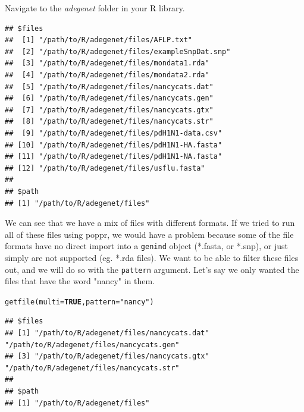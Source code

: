 \documentclass[letterpaper]{article}\usepackage[]{graphicx}\usepackage[]{color}
\makeatletter
\newcommand{\hlnum}[1]{\textcolor[rgb]{0.502,0,0.502}{\textbf{#1}}}%
\newcommand{\hlstr}[1]{\textcolor[rgb]{0.651,0.522,0}{#1}}%
\newcommand{\hlstd}[1]{\textcolor[rgb]{0,0,0}{#1}}%
\newcommand{\hlkwc}[1]{\textcolor[rgb]{0,0.502,0.753}{#1}}%
\newcommand{\hlkwd}[1]{\textcolor[rgb]{0,0.267,0.4}{#1}}%
\newenvironment{kframe}{%
 \def\at@end@of@kframe{}%
 \ifinner\ifhmode%
  \def\at@end@of@kframe{\end{minipage}}%
  \begin{minipage}{\columnwidth}%
 \fi\fi%
 \def\FrameCommand##1{\hskip\@totalleftmargin \hskip-\fboxsep
 \colorbox{shadecolor}{##1}\hskip-\fboxsep
     \hskip-\linewidth \hskip-\@totalleftmargin \hskip\columnwidth}%
 \MakeFramed {\advance\hsize-\width
   \@totalleftmargin\z@ \linewidth\hsize
   \@setminipage}}%
 {\par\unskip\endMakeFramed%
 \at@end@of@kframe}
\newenvironment{knitrout}{}{} %
\makeatother
\begin{document}
Navigate to the \textit{adegenet} folder in your R library.
\begin{knitrout}\footnotesize
{}\color{fgcolor}\begin{kframe}
\begin{verbatim}
## $files
##  [1] "/path/to/R/adegenet/files/AFLP.txt"         
##  [2] "/path/to/R/adegenet/files/exampleSnpDat.snp"
##  [3] "/path/to/R/adegenet/files/mondata1.rda"     
##  [4] "/path/to/R/adegenet/files/mondata2.rda"     
##  [5] "/path/to/R/adegenet/files/nancycats.dat"    
##  [6] "/path/to/R/adegenet/files/nancycats.gen"    
##  [7] "/path/to/R/adegenet/files/nancycats.gtx"    
##  [8] "/path/to/R/adegenet/files/nancycats.str"    
##  [9] "/path/to/R/adegenet/files/pdH1N1-data.csv"  
## [10] "/path/to/R/adegenet/files/pdH1N1-HA.fasta"  
## [11] "/path/to/R/adegenet/files/pdH1N1-NA.fasta"  
## [12] "/path/to/R/adegenet/files/usflu.fasta"      
## 
## $path
## [1] "/path/to/R/adegenet/files"
\end{verbatim}
\end{kframe}
\end{knitrout}


We can see that we have a mix of files with different formats. If we tried to run all of these files using poppr, we would have a problem because some of the file formats have no direct import into a \texttt{genind} object (*.fasta, or *.snp), or just simply are not supported (eg. *.rda files). We want to be able to filter these files out, and we will do so with the \texttt{pattern} argument. Let's say we only wanted the files that have the word "nancy" in them.
\begin{knitrout}\footnotesize
{}\color{fgcolor}\begin{kframe}
\begin{alltt}
\hlkwd{getfile}\hlstd{(}\hlkwc{multi} \hlstd{=} \hlnum{TRUE}\hlstd{,} \hlkwc{pattern} \hlstd{=} \hlstr{"nancy"}\hlstd{)}
\end{alltt}
\end{kframe}
\end{knitrout}

\begin{knitrout}\footnotesize
{}\color{fgcolor}\begin{kframe}
\begin{verbatim}
## $files
## [1] "/path/to/R/adegenet/files/nancycats.dat" "/path/to/R/adegenet/files/nancycats.gen"
## [3] "/path/to/R/adegenet/files/nancycats.gtx" "/path/to/R/adegenet/files/nancycats.str"
## 
## $path
## [1] "/path/to/R/adegenet/files"
\end{verbatim}
\end{kframe}
\end{knitrout}
\end{document}
